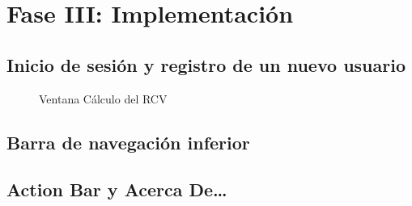 \chapter{Fase III: Implementación}
\label{cap:Implementacion}

\section{Inicio de sesión y registro de un nuevo usuario}

\begin{figure}[htb]
	\centering

		
	\caption{Ventana Cálculo del RCV}
	\label{fig:cirugiaRA}
\end{figure}


\section{Barra de navegación inferior}

\section{Action Bar y Acerca De…}